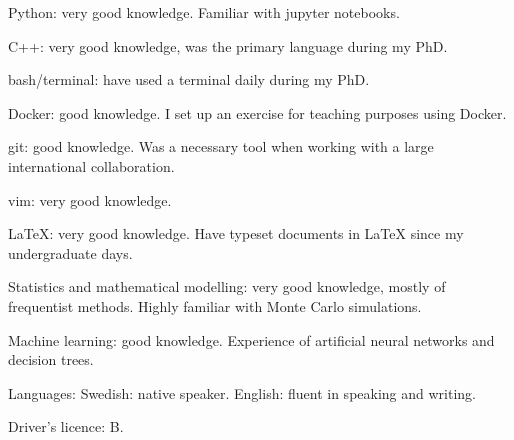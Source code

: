 



\begin{cvskills}


\cvskill
{Python:}
{very good knowledge. Familiar with jupyter notebooks.}

\cvskill
{C++:}
{very good knowledge, was the primary language during my PhD.}

\cvskill
{bash/terminal:}
{have used a terminal daily during my PhD.}

\cvskill
{Docker:} 
{good knowledge. I set up an exercise for teaching purposes using Docker.}

\cvskill
{git:}
{good knowledge. Was a necessary tool when working with a large international collaboration.}

\cvskill
{vim:}
{very good knowledge.}

\cvskill
{LaTeX:}
{very good knowledge. Have typeset documents in LaTeX since my undergraduate days.}

\cvskill
{Statistics and} {}
\cvskill
{mathematical modelling:}
{very good knowledge, mostly of frequentist methods. Highly familiar with Monte Carlo simulations.}

\cvskill
{Machine learning:}
{good knowledge. Experience of artificial neural networks and decision trees.}

\cvskill
{Languages:}
{Swedish: native speaker. English: fluent in speaking and writing.}

\cvskill
{Driver's licence:}
{B.}


\end{cvskills}